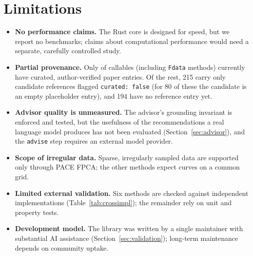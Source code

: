 \section{Limitations}
\label{sec:limitations}

\begin{itemize}
  \item \textbf{No performance claims.}  The Rust core is designed for speed,
    but we report no benchmarks; claims about computational performance would
    need a separate, carefully controlled study.
  \item \textbf{Partial provenance.}  Only \ncoverage{} of \ncallables{}
    callables (including \texttt{Fdata} methods) currently have curated,
    author-verified paper entries.  Of the rest, 215 carry only candidate
    references flagged \texttt{curated: false} (for 80 of these the candidate
    is an empty placeholder entry), and 194 have no reference entry yet.
  \item \textbf{Advisor quality is unmeasured.}  The advisor's grounding
    invariant is enforced and tested, but the usefulness of the recommendations
    a real language model produces has not been evaluated
    (Section~\ref{sec:advisor}), and the \texttt{advise} step requires an
    external model provider.
  \item \textbf{Scope of irregular data.}  Sparse, irregularly sampled data are
    supported only through PACE FPCA; the other methods expect curves on a
    common grid.
  \item \textbf{Limited external validation.}  Six methods are checked against
    independent implementations (Table~\ref{tab:crossimpl}); the remainder rely
    on unit and property tests.
  \item \textbf{Development model.}  The library was written by a single
    maintainer with substantial AI assistance (Section~\ref{sec:validation});
    long-term maintenance depends on community uptake.
\end{itemize}
